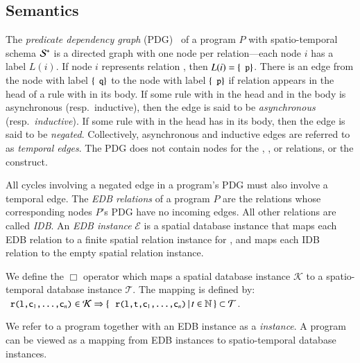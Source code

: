 \subsection{Semantics}
\label{sec:semantics}
The {\em predicate dependency graph} (PDG)~\cite{ullmanbook} of a \lang program $P$ with spatio-temporal schema $\stschema$ is a directed graph with one node per relation---each node $i$ has a label $L(i)$.  If node $i$ represents relation , then $L(i) = \{\dedalus{p}\}$.  There is an edge from the node with label $\{\dedalus{q}\}$ to the node with label $\{\dedalus{p}\}$ if relation  appears in the head of a rule with  in its body.  If some rule with  in the head and  in the body is asynchronous (resp.\ inductive), then the edge is said to be {\em asynchronous} (resp.\ {\em inductive}).  If some rule with  in the head has  in its body, then the edge is said to be {\em negated}.  Collectively, asynchronous and inductive edges are referred to as {\em temporal edges}.  The PDG does not contain nodes for the , , or \dedalus{<} relations, or the  construct.

All cycles involving a negated edge in a \lang program's PDG must also involve a temporal edge.  
The {\em EDB relations} of a \lang program $P$ are the relations whose corresponding nodes $P$'s PDG have no incoming edges.  All other relations are called {\em IDB}.
An {\em EDB instance} $\mathcal{E}$ is a spatial database instance that maps each EDB relation  to a finite spatial relation instance for , and maps each IDB relation  to the empty spatial relation instance.

We define the $\Box$ operator which maps a spatial database instance $\mathcal{K}$ to a spatio-temporal database instance $\mathcal{T}$.  The mapping is defined by: $\dedalus{r(l,c\sub{1},\ldots,c\sub{n})} \in \mathcal{K} \Rightarrow \{ \, \dedalus{r(l,t,c\sub{1},\ldots,c\sub{n})} \, | \, t \in \mathbb{N} \, \} \subset \mathcal{T}$. 

We refer to a \lang program together with an EDB instance as a {\em \lang instance}.  A \lang program can be viewed as a mapping from EDB instances to spatio-temporal database instances.

